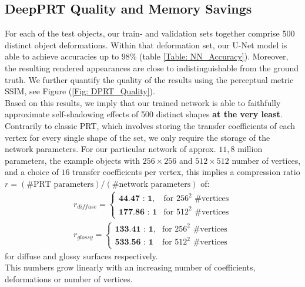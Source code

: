 \subsection*{DeepPRT Quality and Memory Savings} \label{Sec: memory_savings}
For each of the test objects, our train- and validation sets together comprise 500 distinct object deformations. 
Within that deformation set, our U-Net model is able to achieve accuracies up to 98\% (table \ref{Table: NN_Accuracy}). Moreover, the resulting rendered appearances are close to indistinguishable from the ground truth. We further quantify the quality of the results using the perceptual metric SSIM, see Figure (\ref{Fig: DPRT_Quality}). 
\\
Based on this results, we imply that our trained network is able to faithfully approximate self-shadowing effects of 500 distinct shapes \textbf{at the very least}. Contrarily to classic PRT, which involves storing the transfer coefficients of each vertex for every single shape of the set, we only require the storage of the network parameters.
For our particular network of approx. $11,8$ million parameters,  the example objects with $256 \times 256$ and $512 \times 512$ number of vertices, and  a choice of $16$ transfer coefficients per vertex, this implies a compression ratio $r = (\text{\# PRT parameters})/(\text{\# network parameters})$ of: 
\begin{align*}
r_{diffuse} = 
\begin{cases}
\textbf{44.47 : 1} , & \mbox{for } 256^2 \mbox{ \#vertices} \\
\textbf{177.86 : 1} & \mbox{for } 512^2 \mbox{ \#vertices}
\end{cases}
\\
r_{glossy} = 
\begin{cases}
\textbf{133.41 : 1} , & \mbox{for } 256^2 \mbox{ \#vertices} \\
\textbf{533.56 : 1} & \mbox{for } 512^2 \mbox{ \#vertices}
\end{cases}
\end{align*}
for diffuse and glossy surfaces respectively.\\
This numbers grow linearly with an increasing number of coefficients, deformations or number of vertices. 
